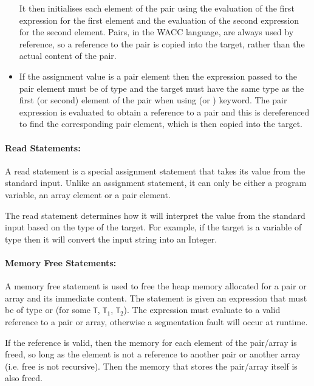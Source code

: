 \documentclass[a4paper]{article}
\theoremstyle{definition}
\begin{document}
\begin{itemize}
       It then initialises each element of the pair using the evaluation of the first expression for the first element 
       and the evaluation of the second expression for the second element.
       Pairs, in the WACC language, are always used by reference, so a reference to the pair is copied into the target, rather than the actual content of the pair.
 \item If the assignment value is a pair element  then the expression passed to the pair element must be of type  
       and the target must have the same type as the first (or second) element of the pair when using  (or ) keyword.
       The pair expression is evaluated to obtain a reference to a pair and this is dereferenced to find the corresponding pair element,
       which is then copied into the target.
 \end{itemize}

\paragraph{Read Statements:}
A read statement  is a special assignment statement that takes its value from the standard input.
Unlike an assignment statement, it can only be either a program variable, an array element or a pair element.

The read statement determines how it will interpret the value from the standard input based on the type of the target.
For example, if the target is a variable of type  then it will convert the input string into an Integer.

\paragraph{Memory Free Statements:}
A memory free statement  is used to free the heap memory allocated for a pair or array and its immediate content. 
The statement is given an expression that must be of type  or  (for some {\tt T}, {\tt T}$_1$, {\tt T}$_2$). 
The expression must evaluate to a valid reference to a pair or array, otherwise a segmentation fault will occur at runtime.

If the reference is valid, then the memory for each element of the pair/array is freed, so long as the element is not a reference to another pair or another array
(i.e. free is not recursive). 
Then the memory that stores the pair/array itself is also freed.
\end{document}
